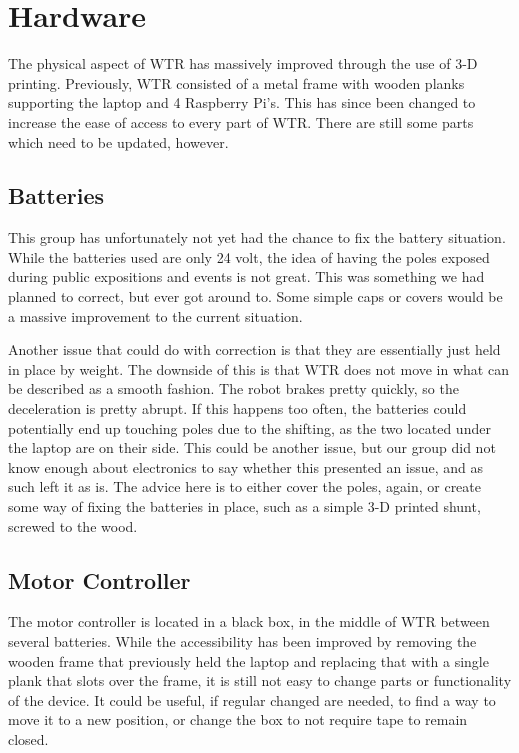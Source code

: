 \section{Hardware}
The physical aspect of WTR has massively improved through the use of 3-D printing.
Previously, WTR consisted of a metal frame with wooden planks supporting the laptop and 4 Raspberry Pi's.
This has since been changed to increase the ease of access to every part of WTR.
There are still some parts which need to be updated, however.

\subsection{Batteries}
This group has unfortunately not yet had the chance to fix the battery situation.
While the batteries used are only 24 volt, the idea of having the poles exposed during public expositions and events is not great.
This was something we had planned to correct, but ever got around to.
Some simple caps or covers would be a massive improvement to the current situation.

Another issue that could do with correction is that they are essentially just held in place by weight.
The downside of this is that WTR does not move in what can be described as a smooth fashion.
The robot brakes pretty quickly, so the deceleration is pretty abrupt.
If this happens too often, the batteries could potentially end up touching poles due to the shifting, as the two located under the laptop are on their side.
This could be another issue, but our group did not know enough about electronics to say whether this presented an issue, and as such left it as is.
The advice here is to either cover the poles, again, or create some way of fixing the batteries in place, such as a simple 3-D printed shunt, screwed to the wood.

\subsection{Motor Controller}
The motor controller is located in a black box, in the middle of WTR between several batteries.
While the accessibility has been improved by removing the wooden frame that previously held the laptop and replacing that with a single plank that slots over the frame, it is still not easy to change parts or functionality of the device.
It could be useful, if regular changed are needed, to find a way to move it to a new position, or change the box to not require tape to remain closed.

